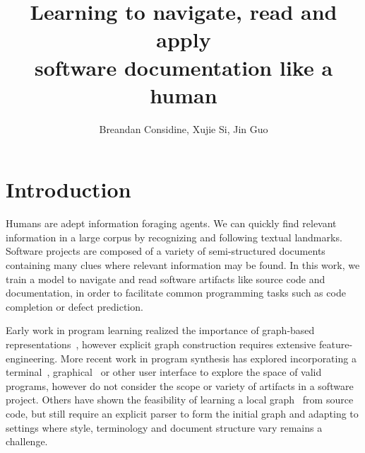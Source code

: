 \documentclass[11pt]{article}
\title{Learning to navigate, read and apply\\software documentation like a human}
\author{Breandan Considine, Xujie Si, Jin Guo}
\begin{document}
\maketitle

\section{Introduction}

Humans are adept information foraging agents. We can quickly find relevant information in a large corpus by recognizing and following textual landmarks. Software projects are composed of a variety of semi-structured documents containing many clues where relevant information may be found. In this work, we train a model to navigate and read software artifacts like source code and documentation, in order to facilitate common programming tasks such as code completion or defect prediction.


Early work in program learning realized the importance of graph-based representations~\cite{allamanis2017learning}, however explicit graph construction requires extensive feature-engineering. More recent work in program synthesis has explored incorporating a terminal~\cite{ellis2019write}, graphical~\cite{walke2020learning} or other user interface to explore the space of valid programs, however do not consider the scope or variety of artifacts in a software project. Others have shown the feasibility of learning a local graph~\cite{johnson2020learning} from source code, but still require an explicit parser to form the initial graph and adapting to settings where style, terminology and document structure vary remains a challenge.

\end{document}
